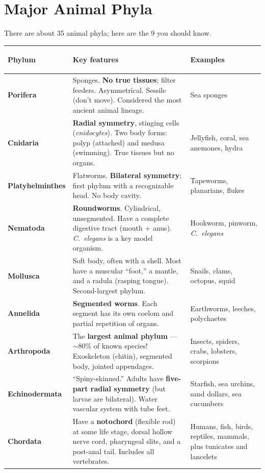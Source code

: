 \documentclass[11pt, letterpaper]{article}
\begin{document}
\section*{Major Animal Phyla}

There are about 35 animal phyla; here are the 9 you should know.

\noindent
{\small\renewcommand{\arraystretch}{1.6}
\begin{tabularx}{\textwidth}{>{\bfseries\raggedright\arraybackslash}p{2.8cm}
                              >{\raggedright\arraybackslash}X
                              >{\raggedright\arraybackslash}p{3.2cm}}
\toprule
\rowcolor{tableheaderpurple}
\textbf{Phylum} & \textbf{Key features} & \textbf{Examples} \\
\midrule
\rowcolor{rowPu} \textbf{Porifera}    & Sponges. \textbf{No true tissues}; filter feeders. Asymmetrical. Sessile (don't move). Considered the most ancient animal lineage. & Sea sponges \\
\rowcolor{rowA}  \textbf{Cnidaria}    & \textbf{Radial symmetry}, stinging cells (\emph{cnidocytes}). Two body forms: polyp (attached) and medusa (swimming). True tissues but no organs. & Jellyfish, coral, sea anemones, hydra \\
\rowcolor{rowPu} \textbf{Platyhelminthes} & Flatworms. \textbf{Bilateral symmetry}; first phylum with a recognizable head. No body cavity. & Tapeworms, planarians, flukes \\
\rowcolor{rowA}  \textbf{Nematoda}    & \textbf{Roundworms}. Cylindrical, unsegmented. Have a complete digestive tract (mouth + anus). \textit{C.\ elegans} is a key model organism. & Hookworm, pinworm, \textit{C.\ elegans} \\
\rowcolor{rowPu} \textbf{Mollusca}    & Soft body, often with a shell. Most have a muscular ``foot,'' a mantle, and a radula (rasping tongue). Second-largest phylum. & Snails, clams, octopus, squid \\
\rowcolor{rowA}  \textbf{Annelida}    & \textbf{Segmented worms}. Each segment has its own coelom and partial repetition of organs. & Earthworms, leeches, polychaetes \\
\rowcolor{rowPu} \textbf{Arthropoda}  & The \textbf{largest animal phylum} --- $\sim$80\% of known species! Exoskeleton (chitin), segmented body, jointed appendages. & Insects, spiders, crabs, lobsters, scorpions \\
\rowcolor{rowA}  \textbf{Echinodermata} & ``Spiny-skinned.'' Adults have \textbf{five-part radial symmetry} (but larvae are bilateral). Water vascular system with tube feet. & Starfish, sea urchins, sand dollars, sea cucumbers \\
\rowcolor{rowPu} \textbf{Chordata}    & Have a \textbf{notochord} (flexible rod) at some life stage, dorsal hollow nerve cord, pharyngeal slits, and a post-anal tail. Includes all vertebrates. & Humans, fish, birds, reptiles, mammals, plus tunicates and lancelets \\
\bottomrule
\end{tabularx}}
\end{document}
